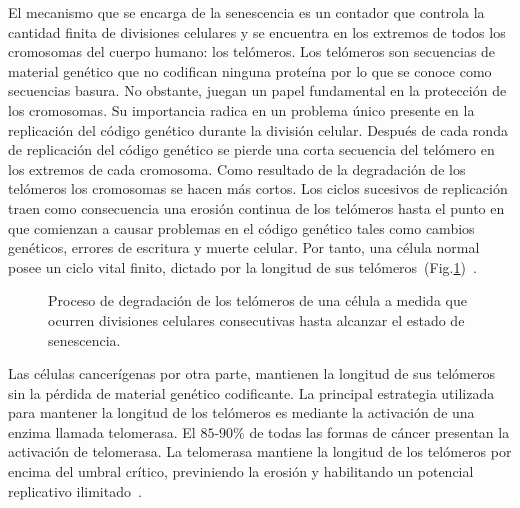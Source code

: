 El mecanismo que se encarga de la senescencia es un contador que controla la cantidad finita de divisiones celulares y se encuentra en los extremos de todos los cromosomas del cuerpo humano: los tel\'omeros. Los tel\'omeros son secuencias de material gen\'etico que no codifican ninguna prote\'ina por lo que se conoce como secuencias basura. No obstante, juegan un papel fundamental en la protecci\'on de los cromosomas. Su importancia radica en un problema \'unico presente en la replicaci\'on del c\'odigo gen\'etico durante la divisi\'on celular. Despu\'es de cada ronda de replicaci\'on del c\'odigo gen\'etico se pierde una corta secuencia del tel\'omero en los extremos de cada cromosoma. Como resultado de la degradaci\'on de los tel\'omeros los cromosomas se hacen m\'as cortos. Los ciclos sucesivos de replicaci\'on traen como consecuencia una erosi\'on continua de los tel\'omeros hasta el punto en que comienzan a causar problemas en el c\'odigo gen\'etico tales como cambios gen\'eticos, errores de escritura y muerte celular. Por tanto, una c\'elula normal posee un ciclo vital finito, dictado por la longitud de sus tel\'omeros~(Fig.\ref{fig-telomero})~\cite{robins,hanahan,cancerbook}.

\begin{figure}[!ht]
\begin{center}
\end{center}\vspace*{-0.6cm}
\caption[Proceso de degradaci\'on de los tel\'omeros de una c\'elula]{Proceso de degradaci\'on de los tel\'omeros de una c\'elula a medida que ocurren divisiones celulares consecutivas hasta alcanzar el estado de senescencia.}
\label{fig-telomero}
\end{figure}

Las c\'elulas cancer\'igenas por otra parte, mantienen la longitud de sus te\-l\'omeros sin la p\'erdida de material gen\'etico codificante. La principal estrategia utilizada para mantener la longitud de los tel\'omeros es mediante la activaci\'on de una enzima llamada telomerasa. El $85$-$90\%$ de todas las formas de c\'ancer presentan la activaci\'on de telomerasa. La telomerasa mantiene la longitud de los tel\'omeros por encima del umbral cr\'itico, previniendo la erosi\'on y habilitando un potencial replicativo ilimitado~\cite{robins,hanahan,cancerbook}.


